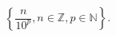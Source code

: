 \documentclass[preview]{standalone}
\begin{document}
\begin{align*}
\left \{ \dfrac{n}{10^p},n\in\mathbb{Z},p\in\mathbb{N} \right \}.
\end{align*}
\end{document}
